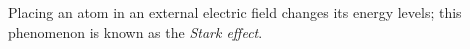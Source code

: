 Placing an atom in an external electric field changes its energy levels; this
phenomenon is known as the \emph{Stark effect}.
